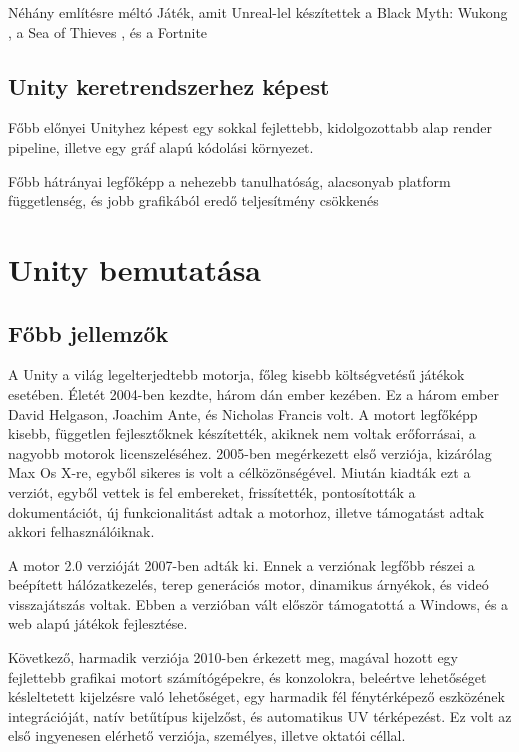 \documentclass[
]{thesis-ekf}
\theoremstyle{definition}
\theoremstyle{remark}
\begin{document}
	Néhány említésre méltó Játék, amit Unreal-lel készítettek a Black Myth: Wukong \cite{wukong}, a Sea of Thieves \cite{seaOfThieves}, és a Fortnite \cite{Fortnite}
	
	\subsection{Unity keretrendszerhez képest}
	Főbb előnyei Unityhez képest egy sokkal fejlettebb, kidolgozottabb alap render pipeline, illetve egy gráf alapú kódolási környezet.
	
	Főbb hátrányai legfőképp a nehezebb tanulhatóság, alacsonyab platform függetlenség, és jobb grafikából eredő teljesítmény csökkenés
	
	\section{Unity bemutatása}
	\subsection{Főbb jellemzők}
	
	A Unity a világ legelterjedtebb motorja, főleg kisebb költségvetésű játékok esetében.\cite{unrealPopularity} Életét 2004-ben kezdte, három dán ember kezében. Ez a három ember David Helgason, Joachim Ante, és Nicholas Francis volt. A motort legfőképp kisebb, független fejlesztőknek készítették, akiknek nem voltak erőforrásai, a nagyobb motorok licenszeléséhez. 2005-ben megérkezett első verziója, kizárólag Max Os X-re, egyből sikeres is volt a célközönségével. Miután kiadták ezt a verziót, egyből vettek is fel embereket, frissítették, pontosították a dokumentációt, új funkcionalitást adtak a motorhoz, illetve támogatást adtak akkori felhasználóiknak.
	
	A motor 2.0 verzióját 2007-ben adták ki. Ennek a verziónak legfőbb részei a beépített hálózatkezelés, terep generációs motor, dinamikus árnyékok, és videó visszajátszás voltak. Ebben a verzióban vált először támogatottá a Windows, és a web alapú játékok fejlesztése.
	
	Következő, harmadik verziója 2010-ben érkezett meg, magával hozott egy fejlettebb grafikai motort számítógépekre, és konzolokra, beleértve lehetőséget késleltetett kijelzésre való lehetőséget, egy harmadik fél fénytérképező eszközének integrációját, natív betűtípus kijelzőst, és automatikus UV térképezést. Ez volt az első ingyenesen elérhető verziója, személyes, illetve oktatói céllal.
	
\end{document}
